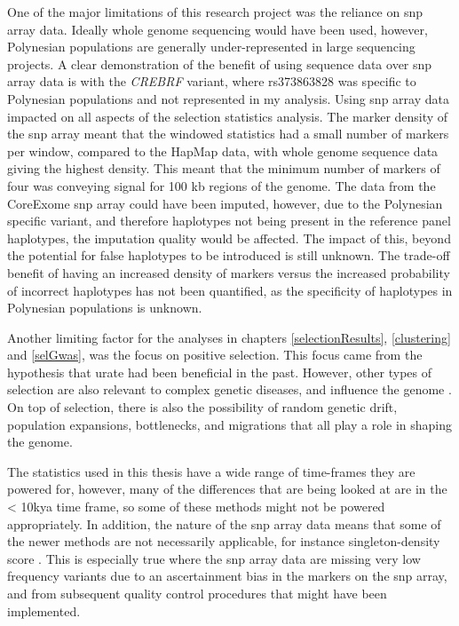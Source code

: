 \documentclass[]{report}
\begin{document}
One of the major limitations of this research project was the reliance
on \gls{snp} array data. Ideally whole genome sequencing would have been
used, however, Polynesian populations are generally under-represented in
large sequencing projects. A clear demonstration of the benefit of using
sequence data over \gls{snp} array data is with the \emph{CREBRF}
variant, where rs373863828 was specific to Polynesian populations
\citep{Minster2016, Krishnan2018} and not represented in my analysis.
Using \gls{snp} array data impacted on all aspects of the selection
statistics analysis. The marker density of the \gls{snp} array meant
that the windowed statistics had a small number of markers per window,
compared to the HapMap data, with whole genome sequence data giving the
highest density. This meant that the minimum number of markers of four
was conveying signal for 100 kb regions of the genome. The data from the
CoreExome \gls{snp} array could have been imputed, however, due to the
Polynesian specific variant, and therefore haplotypes not being present
in the reference panel haplotypes, the imputation quality would be
affected. The impact of this, beyond the potential for false haplotypes
to be introduced is still unknown. The trade-off benefit of having an
increased density of markers versus the increased probability of
incorrect haplotypes has not been quantified, as the specificity of
haplotypes in Polynesian populations is unknown.

Another limiting factor for the analyses in chapters
\ref{selectionResults}, \ref{clustering} and \ref{selGwas}, was the
focus on positive selection. This focus came from the hypothesis that
urate had been beneficial in the past. However, other types of selection
are also relevant to complex genetic diseases, and influence the genome
\citep{Andres2009a, Daub2013}. On top of selection, there is also the
possibility of random genetic drift, population expansions, bottlenecks,
and migrations that all play a role in shaping the genome.

The statistics used in this thesis have a wide range of time-frames they
are powered for, however, many of the differences that are being looked
at are in the \textless{} 10k\gls{ya} time frame, so some of these
methods might not be powered appropriately. In addition, the nature of
the \gls{snp} array data means that some of the newer methods are not
necessarily applicable, for instance singleton-density score
\citep{Field2016}. This is especially true where the \gls{snp} array
data are missing very low frequency variants due to an ascertainment
bias in the markers on the \gls{snp} array, and from subsequent quality
control procedures that might have been implemented.
\end{document}
